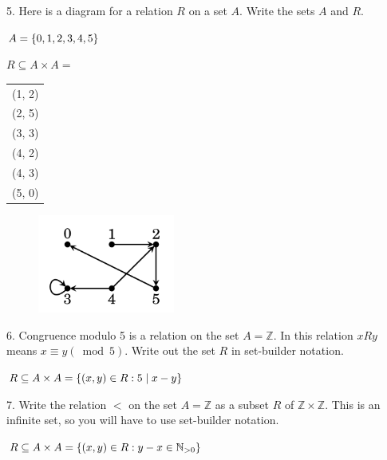 \documentclass[openany, 12pt]{book}
\begin{document}
\begin{exercise}{}{}
	{5. Here is a diagram for a relation $R$ on a set $A$. Write the
		sets $A$ and $R$.}
	\begin{alist}
		\item $A = \{0, 1, 2, 3, 4, 5\}$
		\item $R\subseteq A\times A =$
		\item
		\begin{tabular}{l}
			(1, 2) \\
			(2, 5) \\
			(3, 3) \\
			(4, 2) \\
			(4, 3) \\
			(5, 0)
		\end{tabular}
	\end{alist}
\end{exercise}
\begin{figure}
	\centering
	\includegraphics[width=0.4\textwidth]{images/11-01-05.png}
\end{figure}

\begin{exercise}{}{}
	{6. Congruence modulo 5 is a relation on the set $A=\mathbb{Z}$. In this relation $x R y$ means $x \equiv y(\bmod 5)$. Write out the set $R$ in set-builder notation.}
	\begin{alist}
		\item $R\subseteq A\times A = \{(x, y) \in R: 5\mid x-y\}$
	\end{alist}
\end{exercise}

\begin{exercise}{}{}
	{7. Write the relation $<$ on the set $A=\mathbb{Z}$ as a subset $R$ of $\mathbb{Z} \times \mathbb{Z}$. This is an infinite set, so you will have to use set-builder notation.}
	\begin{alist}
		\item $R\subseteq A\times A = \{(x, y) \in R: y-x \in \mathbb{N}_{>0}\}$
	\end{alist}
\end{exercise}
\end{document}
